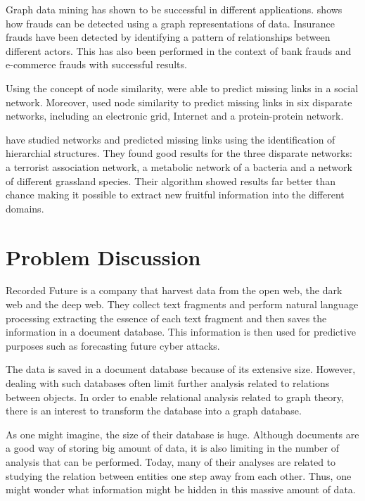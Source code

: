 Graph data mining has shown to be successful in different applications. \citet{bankFraud} shows how frauds can be detected using a graph representations of data. Insurance frauds have been detected by identifying a pattern of relationships between different actors. This has also been performed in the context of bank frauds and e-commerce frauds with successful results. 

Using the concept of node similarity, \citet{Liben-Nowell2003} were able to predict missing links in a social network. Moreover, \citet{Zhou2009} used node similarity to predict missing links in six disparate networks, including an electronic grid, Internet and a protein-protein network.

\citet{clauset2008Hierarchicalstructure} have studied networks and predicted missing links using the identification of hierarchial structures. They found good results for the three disparate networks: a terrorist association network, a metabolic network of a bacteria and a network of different grassland species. Their algorithm showed results far better than chance making it possible to extract new fruitful information into the different domains. 

\section{Problem Discussion}
Recorded Future is a company that harvest data from the open web, the dark web and the deep web. They collect text fragments and perform natural language processing extracting the essence of each text fragment and then saves the information in a document database. This information is then used for predictive purposes such as forecasting future cyber attacks.

The data is saved in a document database because of its extensive size. However, dealing with such databases often limit further analysis related to relations between objects. In order to enable relational analysis related to graph theory, there is an interest to transform the database into a graph database.

As one might imagine, the size of their database is huge. Although documents are a good way of storing big amount of data, it is also limiting in the number of analysis that can be performed. Today, many of their analyses are related to studying the relation between entities one step away from each other. Thus, one might wonder what information might be hidden in this massive amount of data.

